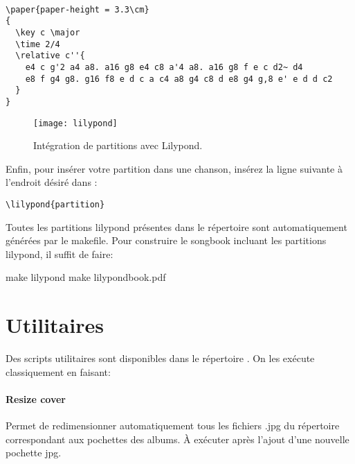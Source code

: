 \documentclass[versionenligne]{patacrep}
\begin{document}
\begin{verbatim}

\paper{paper-height = 3.3\cm}
{
  \key c \major
  \time 2/4
  \relative c''{
    e4 c g'2 a4 a8. a16 g8 e4 c8 a'4 a8. a16 g8 f e c d2~ d4
    e8 f g4 g8. g16 f8 e d c a c4 a8 g4 c8 d e8 g4 g,8 e' e d d c2
  }
}
\end{verbatim}

\begin{figure}
  \centering
  \texttt{[image: lilypond]}
  \caption{Intégration de partitions avec Lilypond.}
  \label{fig:lilypond}
\end{figure}

Enfin, pour insérer votre partition dans une chanson, insérez la ligne
suivante à l'endroit désiré dans :

\begin{verbatim}
\lilypond{partition}
\end{verbatim}

Toutes les partitions lilypond présentes dans le répertoire
 sont automatiquement générées par le
makefile. Pour construire le songbook incluant les partitions
lilypond, il suffit de faire:

\begin{unixcom}
  make lilypond
  make lilypondbook.pdf 
\end{unixcom}


\section{Utilitaires}\label{sect:utilitaires}

Des scripts utilitaires sont disponibles dans le répertoire
. On les exécute classiquement en faisant:


\paragraph{Resize cover}
Permet de redimensionner automatiquement tous les fichiers .jpg du
répertoire  correspondant aux pochettes des albums. À
exécuter après l'ajout d'une nouvelle pochette jpg.
\end{document}
